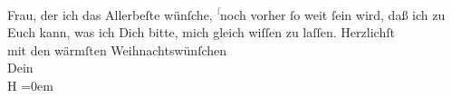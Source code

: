 \begin{ledgroupsized}[t]{13cm}
                  Frau, der ich das Allerbeſte
               wünſche, \substVorne{}\textsuperscript{\textcolor{gray}{ſ}}\substDazwischen{}n\substHinten{}och vorher ſo weit ſein wird, daß ich zu Euch kann, was ich Dich bitte, mich gleich wiſſen zu
               laſſen.\pend
           \pstart
           Herzlichſt{\\[\baselineskip]}mit den wärmſten Weihnachtswünſchen{\\[\baselineskip]}Dein{\\[\baselineskip]}\spacefill\mbox{H}\pend
           \leftskip=0em{}\endnumbering{}\end{ledgroupsized}  \newcommand{\dateiname}{L01744}\newcommand{\titel}{Hermann Bahr an Arthur Schnitzler, 23. 12. 1907}\newcommand{\editorInnen}{ Kurt Ifkovits,  Martin Anton Müller}
      